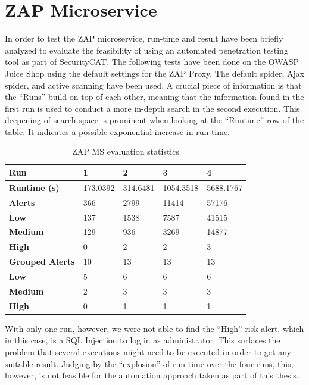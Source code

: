 \section{ZAP Microservice}
In order to test the ZAP microservice, run-time and result have been briefly analyzed to evaluate the feasibility of using an automated penetration testing tool as part of SecurityCAT.
The following tests have been done on the OWASP Juice Shop using the default settings for the ZAP Proxy. The default spider, Ajax spider, and active scanning have been used.
A crucial piece of information is that the \enquote{Runs} build on top of each other, meaning that the information found in the first run is used to conduct a more in-depth search in the second execution. This deepening of search space is prominent when looking at the \enquote{Runtime} row of the table. It indicates a possible exponential increase in run-time.

\newpage

\begin{table}[]
\begin{tabular}{|l|l|l|l|l|}
\hline
\textbf{Run}            & \textbf{1} & \textbf{2} & \textbf{3} & \textbf{4} \\ \hline
\textbf{Runtime (s)}    & 173.0392   & 314.6481   & 1054.3518  & 5688.1767  \\ \hline
\textbf{Alerts}         & 366        & 2799       & 11414      & 57176      \\ \hline
\textbf{Low}            & 137        & 1538       & 7587       & 41515      \\ \hline
\textbf{Medium}         & 129        & 936        & 3269       & 14877      \\ \hline
\textbf{High}           & 0          & 2          & 2          & 3          \\ \hline
\textbf{Grouped Alerts} & 10         & 13         & 13         & 13         \\ \hline
\textbf{Low}            & 5          & 6          & 6          & 6          \\ \hline
\textbf{Medium}         & 2          & 3          & 3          & 3          \\ \hline
\textbf{High}           & 0          & 1          & 1          & 1          \\ \hline
\end{tabular}
\caption{ZAP MS evaluation statistics}
\end{table}

With only one run, however, we were not able to find the \enquote{High} risk alert, which in this case, is a SQL Injection to log in as administrator.
This surfaces the problem that several executions might need to be executed in order to get any suitable result. Judging by the \enquote{explosion} of run-time over the four runs, this, however, is not feasible for the automation approach taken as part of this thesis.

